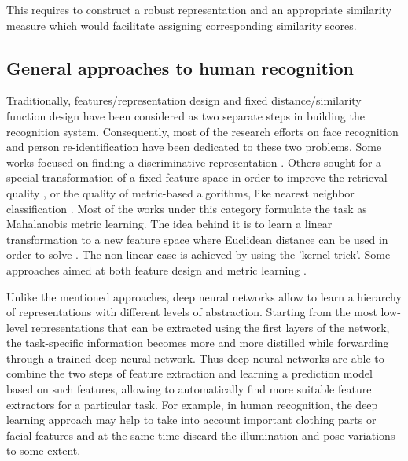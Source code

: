 This requires to construct a robust representation and an appropriate similarity measure which would facilitate assigning corresponding similarity scores.








\subsection{General approaches to human recognition}

Traditionally, features/representation design and fixed distance/similarity function design have been considered as two separate steps in building the recognition system. Consequently, most of the research efforts on face recognition and person re-identification have been dedicated to these two problems. Some works focused on finding a discriminative representation \citep{ma2012bicov, ma2012local, DBLP:journals/cviu/BazzaniCM13}. Others sought for a special transformation of a fixed feature space in order to improve the retrieval quality \citep{hirzer2012person,mignon2012pcca}, or the quality of metric-based algorithms, like nearest neighbor classification \citep{weinberger2009distance}. Most of the works under this category formulate the task as Mahalanobis metric learning. The idea behind it is to learn a linear transformation to a new feature space where Euclidean distance can be used in order to solve . The non-linear case is achieved by using the 'kernel trick'. Some approaches aimed at both feature design and metric learning \citep{liao2015person}.

Unlike the mentioned approaches, deep neural networks allow to learn a hierarchy of representations with different levels of abstraction. Starting from the most low-level representations that can be extracted using the first layers of the network, the task-specific information becomes more and more distilled while forwarding through a trained deep neural network. Thus deep neural networks are able to combine the two steps of feature extraction and learning a prediction model based on such features, allowing to automatically find more suitable feature extractors for a particular task. For example, in human recognition, the deep learning approach may help to take into account important clothing parts or facial features and at the same time discard the illumination and pose variations to some extent.

